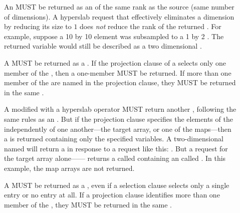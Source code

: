 \documentclass[justify]{nasa-ese}
\begin{document}
\begin{description}
\item[\Array] An \Array MUST be returned as an \Array of the same rank as
  the source \Array (same number of dimensions). A hyperslab request
  that effectively eliminates a 
  dimension by reducing its size to $1$ does \emph{not} reduce the rank of
  the returned \Array. For example, suppose a 10 by 10 element \Array was
  subsampled to a 1 by 2 \Array. The returned variable would still be
  described as a two dimensional \Array.
  
\item[\Structure] A \Structure MUST be returned as a \Structure. If the
  projection clause of a \CE selects only one member of the \Structure, then
  a one-member \Structure MUST be returned. If more than one member of the
  \Structure are named in the projection clause, they MUST be returned in the
  same \Structure.
  
\item[\Grid] A \Grid modified with a hyperslab operator MUST return another
  \Grid, following the same rules as an \Array. But if the projection clause
  specifies the elements of the \Grid independently of one another---the
  target array, or one of the maps---then a \Structure is returned containing
  only the specified variables. A two-dimensional \Grid named 
  will return a \Grid in response to a request like this:
  . But a request for the target array
  alone------ returns a \Structure called
   containing an \Array called . In this example, the
  map arrays are not returned.

  
\item[\Sequence] A \Sequence MUST be returned as a \Sequence, even
  if a selection clause selects only a single entry or no entry at
  all.  If a projection clause identifies more than one member of the
  \Sequence, they MUST be returned in the same \Sequence.

\end{description}
\end{document}
